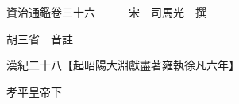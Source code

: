 










 


 
 


 

  
  
  
  
  





  
  
  
  
  
 
  

  

  
  
  



  

 
 

  
   




  

  
  


  　　資治通鑑卷三十六　　　宋　司馬光　撰

　　胡三省　音註

　　漢紀二十八【起昭陽大淵獻盡著雍執徐凡六年】

　　孝平皇帝下


